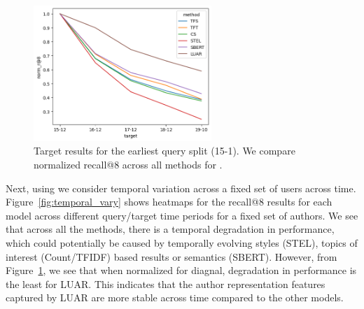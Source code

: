 \begin{figure}
    \centering
    \includegraphics[width=0.6\textwidth]{stylometryExtensions/figures/luar_degradation.png}
    \caption{Target results for the earliest query split (15-1). We compare normalized recall@8 across all methods for \DSvarydelta{}.}
    \label{fig:temporal_vary:line}
\end{figure}
Next, using \DSvarydelta{} we consider temporal variation across a fixed set of users across time.
Figure~\ref{fig:temporal_vary} shows heatmaps for the recall@8 results for each model across different query/target time periods for a fixed set of authors.
We see that across all the methods, there is a temporal degradation in performance, which could potentially be caused by temporally evolving styles (STEL), topics of interest (Count/TFIDF) based results or semantics (SBERT).
However, from Figure~\ref{fig:temporal_vary:line}, we see that when normalized for diagnal, degradation in performance is the least for LUAR.
This indicates that the author representation features captured by LUAR are more stable across time compared to the other models.

